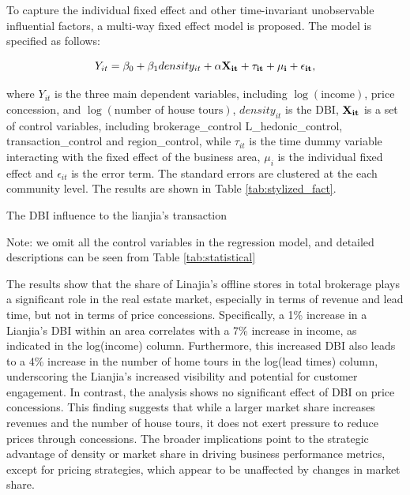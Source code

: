 \documentclass[12pt]{article}
\begin{document}
To capture the individual fixed effect and other time-invariant unobservable influential factors, a multi-way fixed effect model is proposed. The model is specified as follows: 

\begin{equation}
  Y_{it} = \beta_0 + \beta_1 density_{it} + \bf{\alpha} \bf{X}_{it} + \tau_{it} + \mu_i + \epsilon_{it}, \label{eq:multi-way-fe}
\end{equation}

where $Y_{it}$ is the three main dependent variables, including $\log(\text{income})$, price concession, and $\log(\text{number of house tours})$, $density_{it}$ is the DBI, $\bf{X}_{it}$ is a set of control variables, including brokerage\_control L\_hedonic\_control, transaction\_control and region\_control, while $\tau_{it}$ is the time dummy variable interacting with the fixed effect of the business area, $\mu_i$ is the individual fixed effect and $\epsilon_{it}$ is the error term. The standard errors are clustered at the each community level. The results are shown in Table \ref{tab:stylized_fact}.

\begin{table}[htb!]
    \centering
    \begin{scriptsize}
    
    \caption{The DBI influence to the lianjia's transaction}

    Note: we omit all the control variables in the regression model, and detailed descriptions can be seen from Table \ref{tab:statistical}
    \label{tab:stylized_fact}
    \end{scriptsize}
\end{table}

The results show that the share of Linajia's offline stores in total brokerage plays a significant role in the real estate market, especially in terms of revenue and lead time, but not in terms of price concessions. Specifically, a 1\% increase in a Lianjia's DBI within an area correlates with a 7\% increase in income, as indicated in the log(income) column. Furthermore, this increased DBI also leads to a 4\% increase in the number of home tours in the log(lead times) column, underscoring the Lianjia's increased visibility and potential for customer engagement. In contrast, the analysis shows no significant effect of DBI on price concessions. This finding suggests that while a larger market share increases revenues and the number of house tours, it does not exert pressure to reduce prices through concessions. The broader implications point to the strategic advantage of density or market share in driving business performance metrics, except for pricing strategies, which appear to be unaffected by changes in market share.
\end{document}
